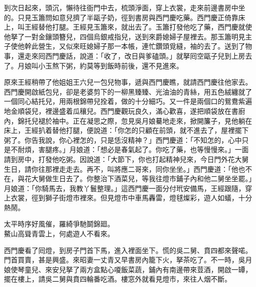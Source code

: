 到次日起來，頭沉，懶待往衙門中去，梳頭淨面，穿上衣裳，走來前邊書房中坐的。只見玉簫問如意兒擠了半甌子奶，徑到書房與西門慶吃藥。西門慶正倚靠床上，叫王經替他打腿。王經見玉簫來，就出去了。玉簫打發他吃了藥，西門慶就使他拏了一對金鑲頭簪兒，四個烏銀戒指兒，送到來爵媳婦子屋裡去。那玉簫明見主子使他幹此營生，又似來旺媳婦子那一本帳，{}連忙鑽頭覓縫，袖的去了。送到了物事，還走來囘西門慶話，說道：「收了，改日與爹磕頭。」就拏囘空甌子兒到上房去了。月娘叫小玉熬下粥，約莫等到飯時前後，還不見進來。

原來王經稍帶了他姐姐王六兒一包兒物事，遞與西門慶瞧，就請西門慶往他家去。西門慶開啟紙包兒，卻是老婆剪下的一柳黑臻臻、光油油的青絲，用五色絨纏就了一個同心結托兒，用兩根錦帶兒拴着，做的十分細巧。{}又一件是兩個口的鴛鴦紫遍地金順袋兒，裡邊盛着瓜穰兒。西門慶觀玩良久，滿心歡喜，遂把順袋放在書廚內，錦托兒褪於袖中。正在凝思之際，忽見吳月娘驀地走來，掀開簾子，見他躺在床上，王經扒着替他打腿，便說道：「你怎的只顧在前頭，就不進去了，屋裡擺下粥了。你告我說，你心裡怎的，只是恁沒精神？」{}西門慶道：「不知怎的，心中只是不耐煩，害腿疼。」月娘道：「想必是春氣起了。你吃了藥，也等慢慢來。」一面請到房中，打發他吃粥。因說道：「大節下，你也打起精神兒來，今日門外花大舅生日，請你往那裡走走去。再不，叫將應二哥來，同你坐坐。」西門慶道：「他也不在，與花大舅做生日去了。你整治下酒菜兒，等我往燈市鋪子內和他二舅坐坐罷。」月娘道：「你騎馬去，我教丫鬟整理。」這西門慶一面分付玳安備馬，王經跟隨，穿上衣裳，徑到獅子街燈市裡來。但見燈市中車馬轟雷，燈毬燦彩，遊人如蟻，十分熱鬧。

\begin{myquote} 
太平時序好風催，羅綺爭馳鬬錦廻。\\鰲山高聳青雲上，何處遊人不看來。
\end{myquote} 

西門慶看了囘燈，到房子門首下馬，進入裡面坐下。慌的吳二舅、賁四都來聲喏。門首買賣，甚是興盛。來昭妻一丈青又早書房內籠下火，拏茶吃了。不一時，吳月娘使琴童兒、來安兒拏了兩方盒點心嗄飯菜蔬，鋪內有南邊帶來荳酒，開啟一罈，擺在樓上，請吳二舅與賁四輪番吃酒。樓窓外就看見燈市，來往人烟不斷。

